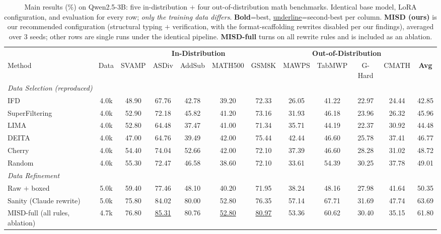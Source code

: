 \documentclass[letterpaper]{article} %
\newcommand{\bad}[1]{\textcolor{misdred}{#1}}
\begin{document}
\begin{table}[t]\centering\footnotesize
\setlength{\tabcolsep}{3.4pt}
\caption{Main results (\%) on Qwen2.5-3B: five in-distribution $+$ four out-of-distribution math benchmarks. Identical base model, LoRA configuration, and evaluation for every row; \emph{only the training data differs}. \textbf{Bold}=best, \underline{underline}=second-best per column. \textbf{MISD (ours)} is our recommended configuration (structural typing $+$ verification, with the format-scaffolding rewrites disabled per our findings), averaged over 3 seeds; other rows are single runs under the identical pipeline. \textbf{MISD-full} turns on all rewrite rules and is included as an ablation.}
\label{tab:main}
\begin{tabular}{l c ccccc cccc c}
\toprule
 & & \multicolumn{5}{c}{\textbf{In-Distribution}} & \multicolumn{4}{c}{\textbf{Out-of-Distribution}} & \\
\cmidrule(lr){3-7}\cmidrule(lr){8-11}
Method & Data & SVAMP & ASDiv & AddSub & MATH500 & GSM8K & MAWPS & TabMWP & G-Hard & CMATH & \textbf{Avg} \\
\midrule
\multicolumn{12}{l}{\textit{Data Selection (reproduced)}}\\
IFD            & 4.0k & 48.90 & 67.76 & 42.78 & 39.20 & 72.33 & 26.05 & 41.22 & 22.97 & 24.44 & 42.85\\
SuperFiltering & 4.0k & 52.90 & 72.18 & 45.82 & 41.20 & 73.16 & 31.93 & 46.18 & 23.96 & 26.32 & 45.96\\
LIMA           & 4.0k & 52.80 & 64.48 & 37.47 & 41.00 & 71.34 & 35.71 & 44.19 & 22.37 & 30.92 & 44.48\\
DEITA          & 4.0k & 47.00 & 64.76 & 39.49 & 42.00 & 75.44 & 42.44 & 46.60 & 25.78 & 37.41 & 46.77\\
Cherry         & 4.0k & 54.40 & 74.04 & 52.66 & 42.00 & 72.10 & 37.39 & 46.60 & 28.28 & 31.02 & 48.72\\
Random         & 4.0k & 55.30 & 72.47 & 46.58 & 38.60 & 72.10 & 33.61 & 54.39 & 30.25 & 37.78 & 49.01\\
\midrule
\multicolumn{12}{l}{\textit{Data Refinement}}\\
Raw $+$ boxed             & 5.0k & 59.40 & 77.46 & 48.10 & 40.20 & 71.95 & 38.24 & 48.16 & 27.98 & 41.64 & 50.35\\
Sanity (Claude rewrite)   & 5.0k & 75.80 & 84.02 & 80.00 & 52.80 & 76.35 & 57.14 & 67.71 & 31.69 & 47.74 & 63.69\\
MISD-full (all rules, ablation)& 4.7k & 76.80 & \underline{85.31} & 80.76 & \underline{52.80} & \underline{80.97} & 53.36 & 60.62 & 30.40 & 35.15 & \bad{61.80}\\

\end{tabular}
\end{table}
\end{document}
